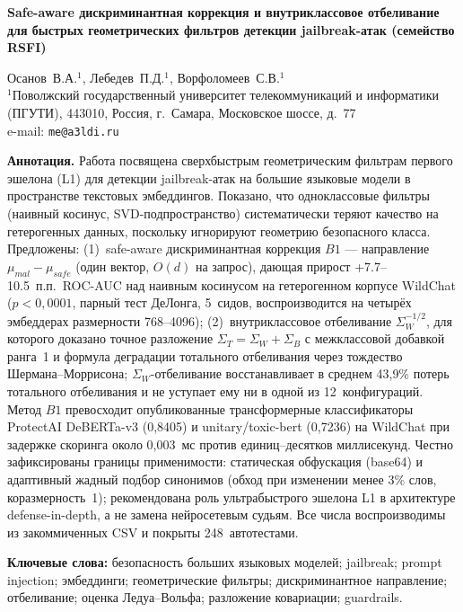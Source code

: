 \documentclass[10pt,a4paper]{article}
\begin{document}
\par\vspace{4pt}
\begin{center}
{\large\bfseries Safe-aware дискриминантная коррекция и внутриклассовое отбеливание для быстрых геометрических фильтров детекции jailbreak-атак (семейство RSFI)\par}
\vspace{4pt}
Осанов~В.А.$^{1}$, Лебедев~П.Д.$^{1}$, Ворфоломеев~С.В.$^{1}$\\
{\small $^{1}$Поволжский государственный университет телекоммуникаций и информатики (ПГУТИ), 443010, Россия, г.~Самара, Московское шоссе, д.~77\\
e-mail: \texttt{me@a3ldi.ru}}
\end{center}
\vspace{3pt}

\noindent\textbf{Аннотация.} Работа посвящена сверхбыстрым геометрическим фильтрам первого эшелона (L1) для детекции jailbreak-атак на большие языковые модели в пространстве текстовых эмбеддингов. Показано, что одноклассовые фильтры (наивный косинус, SVD-подпространство) систематически теряют качество на гетерогенных данных, поскольку игнорируют геометрию безопасного класса. Предложены: (1)~safe-aware дискриминантная коррекция $B1$ — направление $\mu_{mal}-\mu_{safe}$ (один вектор, $O(d)$ на запрос), дающая прирост +7.7--10.5~п.п.\ ROC-AUC над наивным косинусом на гетерогенном корпусе WildChat ($p<0{,}0001$, парный тест ДеЛонга, 5~сидов, воспроизводится на четырёх эмбеддерах размерности 768--4096); (2)~внутриклассовое отбеливание $\Sigma_W^{-1/2}$, для которого доказано точное разложение $\Sigma_T=\Sigma_W+\Sigma_B$ с межклассовой добавкой ранга~1 и формула деградации тотального отбеливания через тождество Шермана--Моррисона; $\Sigma_W$-отбеливание восстанавливает в среднем 43{,}9\% потерь тотального отбеливания и не уступает ему ни в одной из 12~конфигураций. Метод $B1$ превосходит опубликованные трансформерные классификаторы ProtectAI DeBERTa-v3 (0{,}8405) и unitary/toxic-bert (0{,}7236) на WildChat при задержке скоринга около 0{,}003~мс против единиц--десятков миллисекунд. Честно зафиксированы границы применимости: статическая обфускация (base64) и адаптивный жадный подбор синонимов (обход при изменении менее 3\% слов, коразмерность~1); рекомендована роль ультрабыстрого эшелона L1 в архитектуре defense-in-depth, а не замена нейросетевым судьям. Все числа воспроизводимы из закоммиченных CSV и покрыты 248~автотестами.\par\vspace{2pt}
\noindent\textbf{Ключевые слова:} безопасность больших языковых моделей; jailbreak; prompt injection; эмбеддинги; геометрические фильтры; дискриминантное направление; отбеливание; оценка Ледуа--Вольфа; разложение ковариации; guardrails.\par\vspace{5pt}
\end{document}
